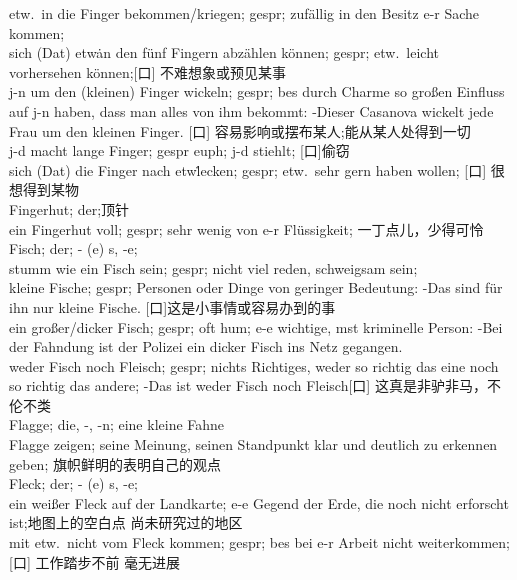 etw.\ in die Finger bekommen/kriegen; gespr; zuf\"allig in den Besitz e-r Sache kommen; \\
sich (Dat) etw\. an den f\"unf Fingern abz\"ahlen k\"onnen; gespr; etw.\ leicht vorhersehen k\"onnen;[口] 不难想象或预见某事\\
j-n um den (kleinen) Finger wickeln; gespr; bes durch Charme so gro\ss{}en Einfluss auf j-n haben, dass man alles von ihm bekommt: -Dieser Casanova wickelt jede Frau um den kleinen Finger. [口] 容易影响或摆布某人;能从某人处得到一切\\
j-d macht lange Finger; gespr euph; j-d stiehlt; [口]偷窃 \\
sich (Dat) die Finger nach etw\. lecken; gespr; etw.\ sehr gern haben wollen; [口] 很想得到某物\\

\noindent
Fingerhut; der;顶针\\
ein Fingerhut voll; gespr; sehr wenig von e-r Fl\"ussigkeit; 一丁点儿，少得可怜\\

\noindent
Fisch; der; \-- (e) s, -e; \\ 
stumm wie ein Fisch sein; gespr; nicht viel reden, schweigsam sein;\\
kleine Fische; gespr; Personen oder Dinge von geringer Bedeutung: -Das sind f\"ur ihn nur kleine Fische. [口]这是小事情或容易办到的事\\
ein gro\ss{}er/dicker Fisch; gespr; oft hum; e-e wichtige, mst kriminelle Person: -Bei der Fahndung ist der Polizei ein dicker Fisch ins Netz gegangen.\\
weder Fisch noch Fleisch; gespr; nichts Richtiges, weder so richtig das eine noch so richtig das andere; -Das ist weder Fisch noch Fleisch[口] 这真是非驴非马，不伦不类\\

\noindent
Flagge; die, -, -n; eine kleine Fahne \\
Flagge zeigen; seine Meinung, seinen Standpunkt klar und deutlich zu erkennen geben; 旗帜鲜明的表明自己的观点\\

\noindent
Fleck; der; \-- (e) s, -e; \\
ein wei\ss{}er Fleck auf der Landkarte; e-e Gegend der Erde, die noch nicht erforscht ist;地图上的空白点 尚未研究过的地区\\
mit etw.\ nicht vom Fleck kommen; gespr; bes bei e-r Arbeit nicht weiterkommen; [口] 工作踏步不前 毫无进展\\

